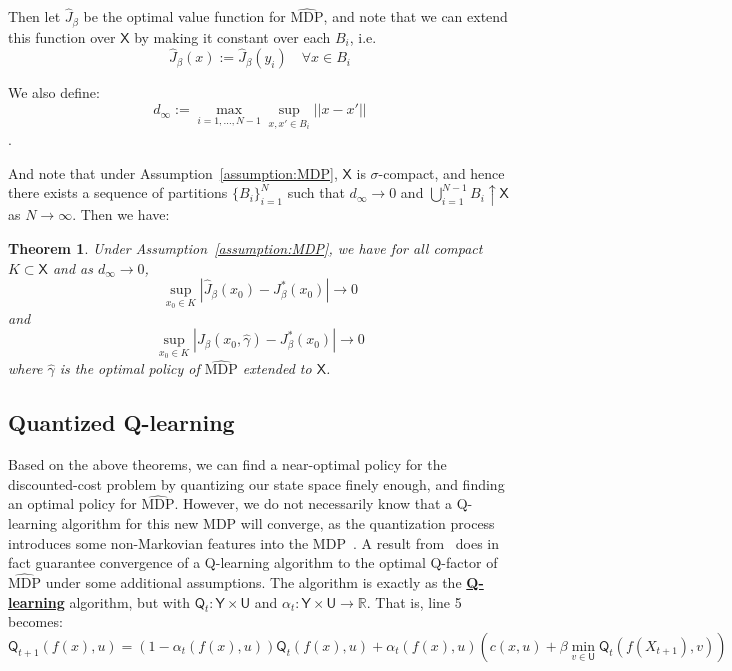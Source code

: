 \documentclass[conference, draftcls, onecolumn]{IEEEtran}
\newtheorem{theorem}{Theorem}
\begin{document}
Then let \(\hat{J}_\beta\) be the optimal value function for \(\hat{\text{MDP}}\), and note that we can extend this function over \(\mathsf{X}\) by making it constant over each \(B_i\), i.e.
\[ \hat{J}_\beta(x) := \hat{J}_\beta(y_i) \quad \forall x \in B_i \]

We also define:
\[ d_\infty := \max_{i=1,\ldots,N-1} \sup_{x,x' \in B_i}||x-x'||\].

And note that under Assumption~\ref{assumption:MDP}, \(\mathsf{X}\) is \(\sigma\)-compact, and hence there exists a sequence of partitions \(\{B_i\}_{i=1}^N\) such that \(d_\infty \to 0\) and \(\bigcup_{i=1}^{N-1}B_i \uparrow \mathsf{X}\) as \(N \to \infty\). Then we have:

\begin{theorem}\label{theorem:2.3}\cite[Theorem 4.27]{Quantized_Models}
    Under Assumption~\ref{assumption:MDP}, we have for all compact \(K \subset \mathsf{X}\) and as \(d_\infty \to 0\),
    \[ \sup_{x_0 \in K}|\hat{J}_\beta(x_0) - J^*_\beta(x_0)| \to 0 \]
    and
    \[ \sup_{x_0 \in K}|J_\beta(x_0,\hat{\gamma}) - J^*_\beta(x_0)| \to 0 \]
    where \(\hat{\gamma}\) is the optimal policy of \(\hat{\text{MDP}}\) extended to \(\mathsf{X}\).
\end{theorem}

\subsection{Quantized Q-learning}
Based on the above theorems, we can find a near-optimal policy for the discounted-cost problem by quantizing our state space finely enough, and finding an optimal policy for \(\hat{\text{MDP}}\). However, we do not necessarily know that a Q-learning algorithm for this new MDP will converge, as the quantization process introduces some non-Markovian features into the MDP~\cite{Kara}. A result from~\cite{Kara} does in fact guarantee convergence of a Q-learning algorithm to the optimal Q-factor of \(\hat{\text{MDP}}\) under some additional assumptions. The algorithm is exactly as the \hyperref[algorithm:Q-learning]{\textbf{Q-learning}} algorithm, but with \(\mathsf{Q}_t : \mathsf{Y} \times \mathsf{U}\) and \(\alpha_t : \mathsf{Y} \times \mathsf{U} \to \mathbb{R}\). That is, line 5 becomes:
\begin{equation}\mathsf{Q}_{t+1}(f(x),u) = (1- \alpha_t(f(x),u))\mathsf{Q}_t(f(x),u) +
    \alpha_t(f(x),u)(c(x,u)+\beta \; \underset{v\in\mathsf{U}}{\text{min}} \; \mathsf{Q}_t(f(X_{t+1}),v))\label{eq:Q-factor-quantized}\end{equation}
\end{document}
